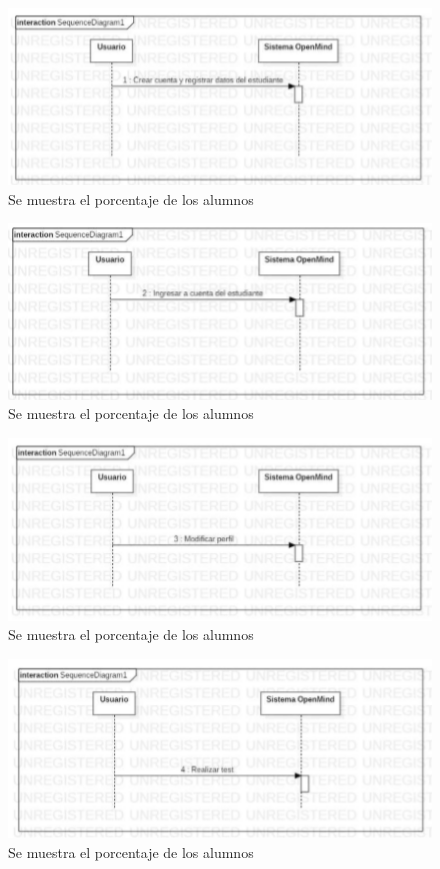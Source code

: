 \documentclass[letterpaper,oneside,openany,11pt]{book}
\begin{document}
\begin{figure}[H]
	\centering
	\includegraphics[width=1.0\textwidth]{./Imagenes/23}
	\caption{Se muestra el porcentaje de los alumnos}
\end{figure}

\begin{figure}[H]
	\centering
	\includegraphics[width=1.0\textwidth]{./Imagenes/24}
	\caption{Se muestra el porcentaje de los alumnos}
\end{figure}

\begin{figure}[H]
	\centering
	\includegraphics[width=1.0\textwidth]{./Imagenes/25}
	\caption{Se muestra el porcentaje de los alumnos}
\end{figure}

\begin{figure}[H]
	\centering
	\includegraphics[width=1.0\textwidth]{./Imagenes/26}
	\caption{Se muestra el porcentaje de los alumnos}
\end{figure}
\end{document}

